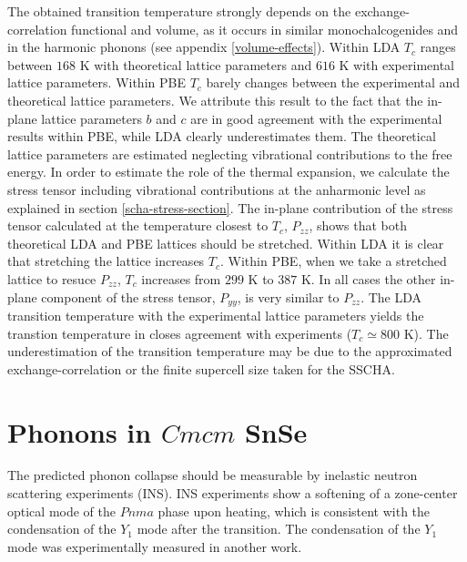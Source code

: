 The obtained transition temperature strongly depends on the exchange-correlation functional and volume, as it occurs in similar monochalcogenides\cite{ribeiro2018strong} and in the harmonic phonons (see appendix \ref{volume-effects}). 
Within LDA $T_{c}$ ranges between $168$ K with 
theoretical lattice parameters and $616$ K with experimental lattice parameters. Within PBE $T_{c}$ barely changes between the experimental and theoretical lattice parameters. We attribute this result to the fact that 
the in-plane lattice parameters $b$ and $c$ are in good agreement with the experimental results within PBE, while LDA clearly underestimates them. The theoretical lattice parameters are estimated neglecting vibrational 
contributions to the free energy. In order to estimate the role of the thermal expansion, we calculate the stress tensor including vibrational contributions at the anharmonic level as explained in 
section \ref{scha-stress-section}. The in-plane contribution of the stress tensor calculated at the temperature closest to $T_{c}$, $P_{zz}$, shows that both theoretical LDA and PBE lattices should be stretched. Within LDA it 
is clear that stretching the lattice increases $T_{c}$. Within PBE, when we take a stretched lattice to resuce $P_{zz}$, $T_{c}$ increases from $299$ K to $387$ K. In all cases the other in-plane component of the stress tensor, 
$P_{yy}$, is very similar to $P_{zz}$. The LDA transition temperature with the experimental lattice parameters yields the transtion temperature in closes agreement with experiments ($T_{c}\simeq800$ K). The underestimation of the 
transition temperature may be due to the approximated exchange-correlation or the finite supercell size taken for the SSCHA. \\

\section{Phonons in $Cmcm$ SnSe}

The predicted phonon collapse should be measurable by inelastic neutron scattering experiments (INS). INS experiments\cite{li2015orbitally} show a softening of a zone-center optical mode of the $Pnma$ phase upon heating, which
is consistent with the condensation of the $Y_{1}$ mode after the transition. The condensation of the $Y_{1}$ mode 
was experimentally measured in another work\cite{chatterji2018soft}. \\

